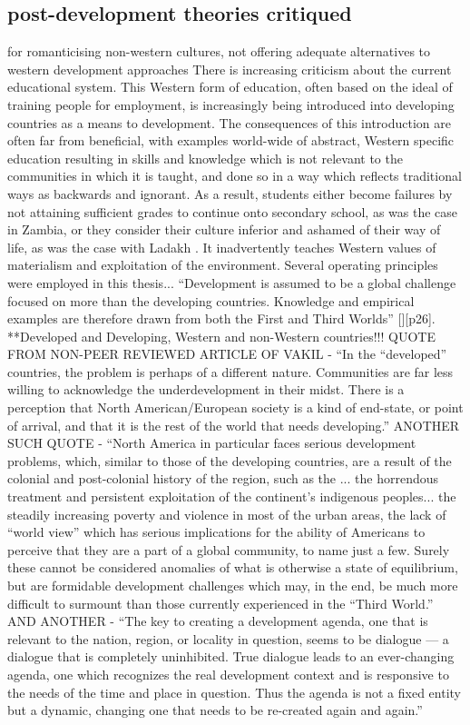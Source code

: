 \subsection{post-development theories critiqued} for romanticising non-western cultures, not offering adequate alternatives to western development approaches
There is increasing criticism about the current educational system. This Western form of education, often based on the ideal of training people for employment, is increasingly being introduced into developing countries as a means to development. The consequences of this introduction are often far from beneficial, with examples world-wide of abstract, Western specific education resulting in skills and knowledge which is not relevant to the communities in which it is taught, and done so in a way which reflects traditional ways as backwards and ignorant. As a result, students either become failures by not attaining sufficient grades to continue onto secondary school, as was the case in Zambia, or they consider their culture inferior and ashamed of their way of life, as was the case with Ladakh \citep{Norberg-hodge2016}. It inadvertently teaches Western values of materialism and exploitation of the environment.
Several operating principles were employed in this thesis... “Development is assumed to be a global challenge focused on more than the developing countries. Knowledge and empirical examples are therefore drawn from both the First and Third Worlds” [][p26]. **Developed and Developing, Western and non-Western countries!!! \citep{Vakil2001}        QUOTE FROM NON-PEER REVIEWED ARTICLE OF VAKIL - “In the “developed” countries, the problem is perhaps of a different nature. Communities are far less willing to acknowledge the underdevelopment in their midst. There is a perception that North American/European society is a kind of end-state, or point of arrival, and that it is the rest of the world that needs developing.”  ANOTHER SUCH QUOTE - “North America in particular faces serious development problems, which, similar to those of the developing countries, are a result of the colonial and post-colonial history of the region, such as the ... the horrendous treatment and persistent exploitation of the continent’s indigenous peoples... the steadily increasing poverty and violence in most of the urban areas, the lack of “world view” which has serious implications for the ability of Americans to perceive that they are a part of a global community, to name just a few. Surely these cannot be considered anomalies of what is otherwise a state of equilibrium, but are formidable development challenges which may, in the end, be much more difficult to surmount than those currently experienced in the “Third World.”    AND ANOTHER - “The key to creating a development agenda, one that is relevant to the nation, region, or locality in question, seems to be dialogue — a dialogue that is completely uninhibited. True dialogue leads to an ever-changing agenda, one which recognizes the real development context and is responsive to the needs of the time and place in question. Thus the agenda is not a fixed entity but a dynamic, changing one that needs to be re-created again and again.”
